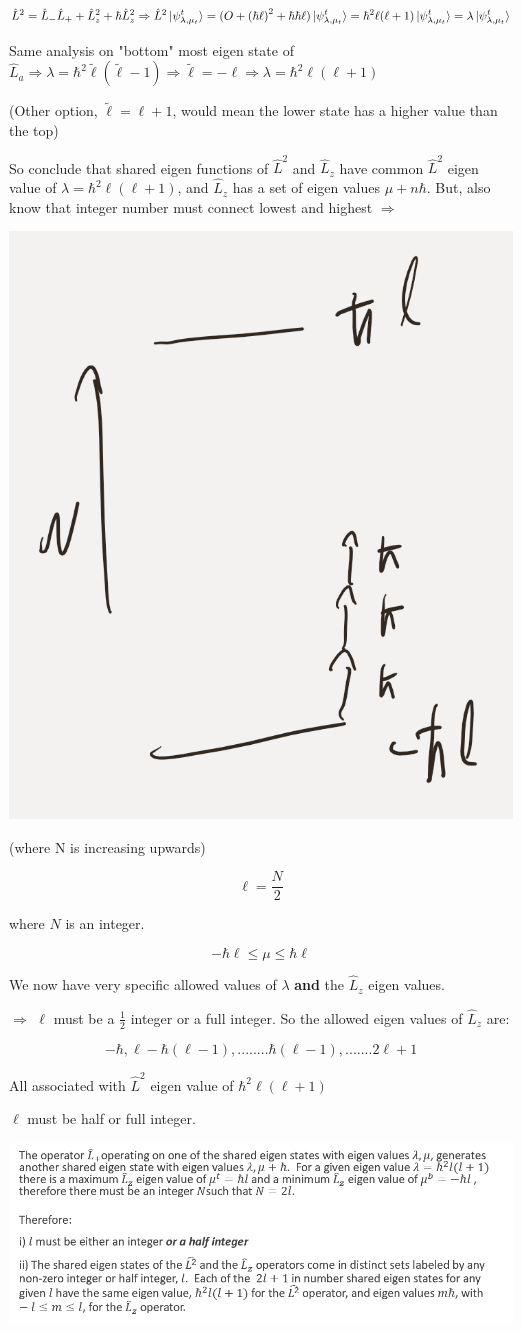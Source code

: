 \documentclass{article}
\begin{document}
$$\hat{L}^2 = \hat{L}_- \hat{L}_+ + \hat{L}_z^2 + \hbar \hat{L}_z^2 \Rightarrow \hat{L}^2 \ket{\psi^t_{\lambda, \mu_t}} = (O + \left( \hbar \ell \right)^2 + \hbar \hbar \ell)\ket{\psi^t_{\lambda, \mu_t}}  = \hbar^2 \ell (\ell + 1)\ket{\psi^t_{\lambda, \mu_t}} = \lambda \ket{\psi^t_{\lambda, \mu_t}}$$

Same analysis on "bottom" most eigen state of $\hat{L}_a \Rightarrow \lambda = \hbar^2 \tilde{\ell}(\tilde{\ell} - 1) \Rightarrow \tilde{\ell} = -\ell \Rightarrow \lambda = \hbar^2 \ell(\ell + 1)$

(Other option, $\tilde{\ell} = \ell + 1$, would mean the lower state has a higher value than the top)

So conclude that shared eigen functions of $\hat{L}^2$ and $\hat{L}_z$ have common $\hat{L}^2$ eigen value of $\lambda = \hbar^2 \ell(\ell + 1)$, and $\hat{L}_z$ has a set of eigen values $\mu + n \hbar$. But, also know that integer number must connect lowest and highest $\Rightarrow$

\includegraphics[width = 0.2 \textwidth]{Lecture22/2.png}

(where N is increasing upwards)



$$\ell = \frac{N}{2}$$

where $N$ is an integer. 

$$- \hbar \ell \leq \mu \leq \hbar \ell$$

We now have very specific allowed values of $\lambda$ \textbf{and} the $\hat{L}_z$ eigen values. 

$\Rightarrow$ $\ell$ must be a $\frac{1}{2}$ integer or a full integer. So the allowed eigen values of $\hat{L}_z$ are:

$$-\hbar, \ell - \hbar(\ell-1),........\hbar(\ell - 1), ....... 2 \ell + 1$$

All associated with $\hat{L}^2$ eigen value of $\hbar^2 \ell(\ell + 1)$

$\ell$ must be half or full integer. 

\includegraphics[width = 0.8 \textwidth]{Lecture22/3.png}
\end{document}
